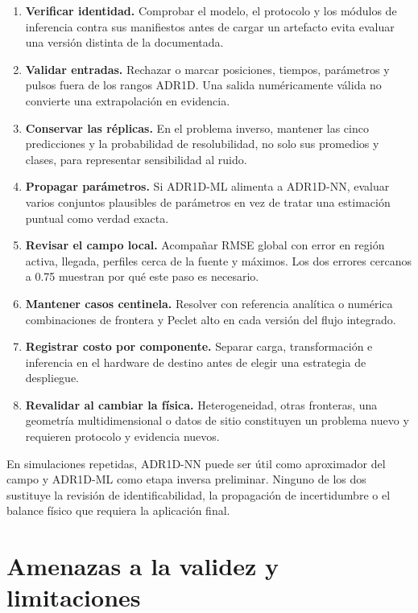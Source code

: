 \documentclass[11pt,a4paper]{article}
\begin{document}
\begin{enumerate}
    \item \textbf{Verificar identidad.} Comprobar el modelo, el protocolo y los
    módulos de inferencia contra sus manifiestos antes de cargar un artefacto
    evita evaluar una versión distinta de la documentada.
    \item \textbf{Validar entradas.} Rechazar o marcar posiciones, tiempos,
    parámetros y pulsos fuera de los rangos ADR1D. Una salida numéricamente
    válida no convierte una extrapolación en evidencia.
    \item \textbf{Conservar las réplicas.} En el problema inverso, mantener las
    cinco predicciones y la probabilidad de resolubilidad, no solo sus promedios
    y clases, para representar sensibilidad al ruido.
    \item \textbf{Propagar parámetros.} Si ADR1D-ML alimenta a ADR1D-NN,
    evaluar varios conjuntos plausibles de parámetros en vez de tratar una
    estimación puntual como verdad exacta.
    \item \textbf{Revisar el campo local.} Acompañar RMSE global con error en
    región activa, llegada, perfiles cerca de la fuente y máximos. Los dos
    errores cercanos a 0.75 muestran por qué este paso es necesario.
    \item \textbf{Mantener casos centinela.} Resolver con referencia analítica
    o numérica combinaciones de frontera y Peclet alto en cada versión del
    flujo integrado.
    \item \textbf{Registrar costo por componente.} Separar carga,
    transformación e inferencia en el hardware de destino antes de elegir una
    estrategia de despliegue.
    \item \textbf{Revalidar al cambiar la física.} Heterogeneidad, otras
    fronteras, una geometría multidimensional o datos de sitio constituyen un
    problema nuevo y requieren protocolo y evidencia nuevos.
\end{enumerate}

En simulaciones repetidas, ADR1D-NN puede ser útil como aproximador del campo y
ADR1D-ML como etapa inversa preliminar. Ninguno de los dos sustituye la revisión
de identificabilidad, la propagación de incertidumbre o el balance físico que
requiera la aplicación final.

\section{Amenazas a la validez y limitaciones}
\end{document}
